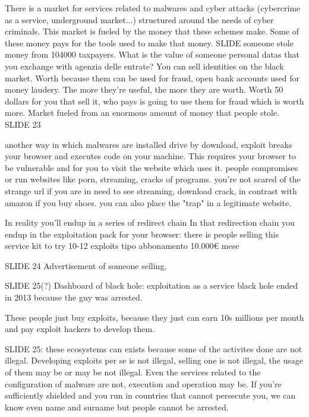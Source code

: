         There is a market for services related to malwares and cyber attacks (cybercrime as a service, underground market...) structured around the needs of cyber criminals.
        This market is fueled by the money that these schemes make. Some of these money pays for the tools used to make that money.
SLIDE 
    someone stole money from 104000 taxpayers.
    What is the value of someone personal datas that you exchange with agenzia delle entrate?
    You can sell identities on the black market. Worth because them can be used for fraud, open bank accounts used for money laudery.
    The more they're useful, the more they are worth.
    Worth 50 dollars for you that sell it, who pays is going to use them for fraud which is worth more.
    Market fueled from an enormous amount of money that people stole.
SLIDE 23

    another way in which malwares are installed
    drive by download, exploit breaks your browser and executes code on your machine. This requires your browser to be vulnerable and for you to visit the website which uses it.
    people compromises or run websites like porn, streaming, cracks of programs.
    you're not scared of the strange url if you are in need to see streaming, download crack, in contrast with amazon if you buy shoes.
    you can also place the "trap" in a legitimate website.

    In reality you'll endup in a series of redirect chain 
    In that redirection chain you endup in the exploitation pack for your browser:
        there is people selling this service kit to try 10-12 exploits tipo abbonamento 10.000€ mese 

SLIDE 24
    Advertisement of someone selling, 

SLIDE 25(?)
    Dashboard of black hole: exploitation as a service
    black hole ended in 2013 because the guy was arrested.

    These people just buy exploits, because they just can earn 10s millions per month and pay exploit hackers to develop them.

SLIDE 25:
    these ecosystems can exists because some of the activites done are not illegal. Developing exploits per se is not illegal, selling one is not illegal, the usage of them may be or may be not illegal.
    Even the services related to the configuration of malware are not, execution and operation may be.
    If you're sufficiently shielded and you run in countries that cannot persecute you, we can know even name and surname but people cannot be arrested.

